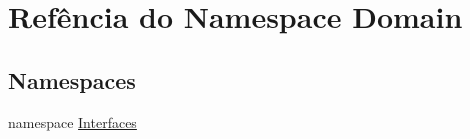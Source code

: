 \hypertarget{namespaceDomain}{}\section{Refência do Namespace Domain}
\label{namespaceDomain}
\subsection*{Namespaces}
\begin{DoxyCompactItemize}
\item 
namespace \hyperlink{namespaceDomain_1_1Interfaces}{Interfaces}
\end{DoxyCompactItemize}
